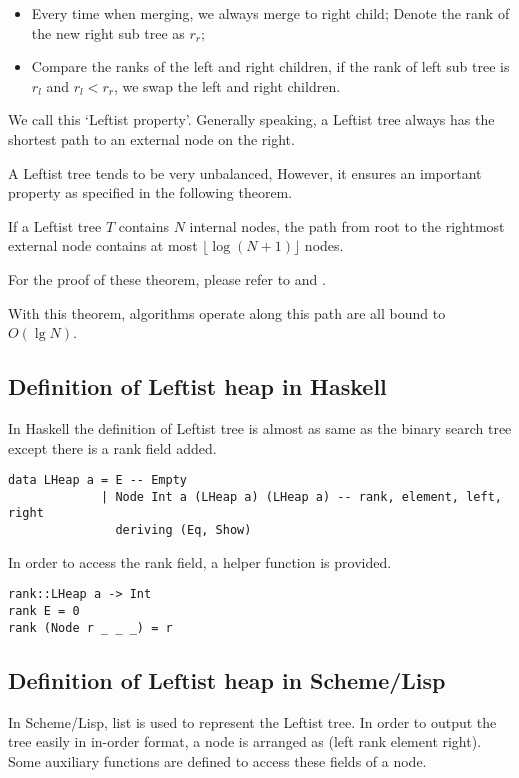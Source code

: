 \documentclass{article}
\begin{document}
\begin{itemize}
\item Every time when merging, we always merge to right child; Denote the rank
of the new right sub tree as $r_r$;
\item Compare the ranks of the left and right children, if the rank of
left sub tree is $r_l$ and $r_l < r_r$, we swap the left and right children.
\end{itemize}

We call this `Leftist property'. Generally speaking, a Leftist tree always
has the shortest path to an external node on the right.

A Leftist tree tends to be very unbalanced, However, it ensures an important
property as specified in the following theorem.

If a Leftist tree $T$ contains $N$ internal nodes, the path from root to the
rightmost external node contains at most $\lfloor \log{(N+1)} \rfloor$ nodes.

For the proof of these theorem, please refer to \cite{brono-book} and \cite{TAOCP}.

With this theorem, algorithms operate along this path are all bound to $O(\lg N)$.

\subsection*{Definition of Leftist heap in Haskell}

In Haskell the definition of Leftist tree is almost as same as the
binary search tree except there is a rank field added.

\lstset{language=Haskell}
\begin{lstlisting}
data LHeap a = E -- Empty
             | Node Int a (LHeap a) (LHeap a) -- rank, element, left, right
               deriving (Eq, Show)
\end{lstlisting}

In order to access the rank field, a helper function is provided.

\begin{lstlisting}
rank::LHeap a -> Int
rank E = 0
rank (Node r _ _ _) = r
\end{lstlisting}

\subsection*{Definition of Leftist heap in Scheme/Lisp}

In Scheme/Lisp, list is used to represent the Leftist tree. In order
to output the tree easily in in-order format, a node is arranged as
(left rank element right). Some auxiliary functions are defined
to access these fields of a node.
\end{document}

